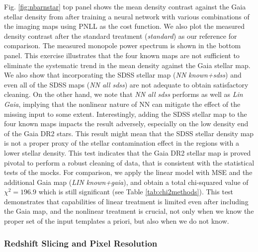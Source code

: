 Fig. \ref{fig:nbarnstar} top panel shows the mean density contrast against the Gaia stellar density from \cite{gaia2018} after training a neural network with various combinations of the imaging maps using PNLL as the cost function. We also plot the measured density contrast after the standard treatment (\textit{standard}) as our reference for comparison. The measured monopole power spectrum is shown in the bottom panel. This exercise illustrates that the four known maps are not sufficient to eliminate the systematic trend in the mean density against the Gaia stellar map. We also show that incorporating the SDSS stellar map (\textit{NN known+sdss}) and even all of the SDSS maps (\textit{NN all sdss}) are not adequate to obtain satisfactory cleaning. On the other hand, we note that \textit{NN all sdss} performs as well as \textit{Lin Gaia}, implying that the nonlinear nature of NN can mitigate the effect of the missing input to some extent. Interestingly, adding the SDSS stellar map to the four known maps impacts the result adversely, especially on the low density end of the Gaia DR2 stars. This result might mean that the SDSS stellar density map is not a proper proxy of the stellar contamination effect in the regions with a lower stellar density. This test indicates that the Gaia DR2 stellar map is proved pivotal to perform a robust cleaning of data, that is consistent with the statistical tests of the mocks. For comparison, we apply the linear model with MSE and the additional Gaia map (\textit{LIN known+gaia}), and obtain a total chi-squared value of $\chi^{2}=196.9$ which is still significant (see Table \ref{tab:chi2methods}). This test demonstrates that capabilities of linear treatment is limited even after including the Gaia map, and the nonlinear treatment is crucial, not  only when we know the proper set of the input templates a priori, but also when we do not know. 

\subsubsection{Redshift Slicing and Pixel Resolution}\label{subsec:slicing}

